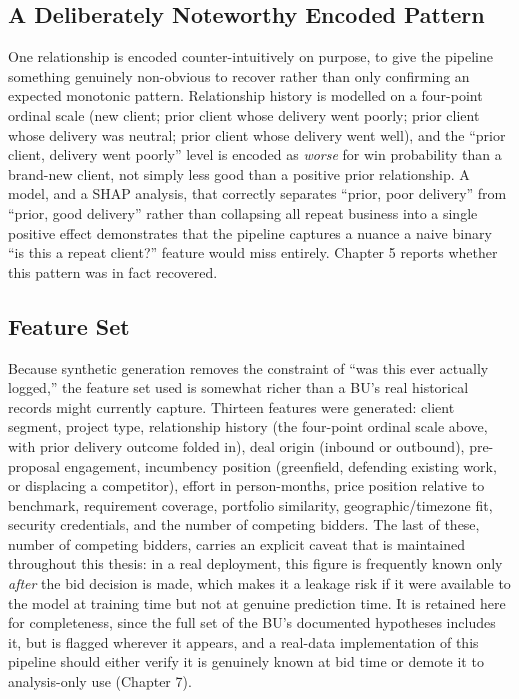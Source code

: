 \hypertarget{a-deliberately-noteworthy-encoded-pattern}{%
\subsection{A Deliberately Noteworthy Encoded
Pattern}\label{a-deliberately-noteworthy-encoded-pattern}}

One relationship is encoded counter-intuitively on purpose, to give the
pipeline something genuinely non-obvious to recover rather than only
confirming an expected monotonic pattern. Relationship history is
modelled on a four-point ordinal scale (new client; prior client whose
delivery went poorly; prior client whose delivery was neutral; prior
client whose delivery went well), and the ``prior client, delivery went
poorly'' level is encoded as \emph{worse} for win probability than a
brand-new client, not simply less good than a positive prior
relationship. A model, and a SHAP analysis, that correctly separates
``prior, poor delivery'' from ``prior, good delivery'' rather than
collapsing all repeat business into a single positive effect
demonstrates that the pipeline captures a nuance a naive binary ``is
this a repeat client?'' feature would miss entirely. Chapter 5 reports
whether this pattern was in fact recovered.

\hypertarget{feature-set}{%
\subsection{Feature Set}\label{feature-set}}

Because synthetic generation removes the constraint of ``was this ever
actually logged,'' the feature set used is somewhat richer than a BU's
real historical records might currently capture. Thirteen features were
generated: client segment, project type, relationship history (the
four-point ordinal scale above, with prior delivery outcome folded in),
deal origin (inbound or outbound), pre-proposal engagement, incumbency
position (greenfield, defending existing work, or displacing a
competitor), effort in person-months, price position relative to
benchmark, requirement coverage, portfolio similarity,
geographic/timezone fit, security credentials, and the number of
competing bidders. The last of these, number of competing bidders,
carries an explicit caveat that is maintained throughout this thesis: in
a real deployment, this figure is frequently known only \emph{after} the
bid decision is made, which makes it a leakage risk if it were available
to the model at training time but not at genuine prediction time. It is
retained here for completeness, since the full set of the BU's
documented hypotheses includes it, but is flagged wherever it appears,
and a real-data implementation of this pipeline should either verify it
is genuinely known at bid time or demote it to analysis-only use
(Chapter 7).

